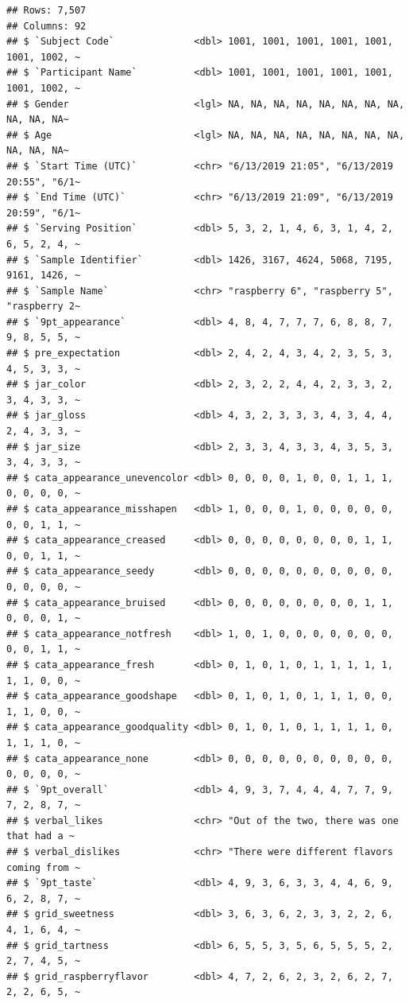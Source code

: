 \documentclass[
]{book}
\begin{document}
\begin{verbatim}
## Rows: 7,507
## Columns: 92
## $ `Subject Code`              <dbl> 1001, 1001, 1001, 1001, 1001, 1001, 1002, ~
## $ `Participant Name`          <dbl> 1001, 1001, 1001, 1001, 1001, 1001, 1002, ~
## $ Gender                      <lgl> NA, NA, NA, NA, NA, NA, NA, NA, NA, NA, NA~
## $ Age                         <lgl> NA, NA, NA, NA, NA, NA, NA, NA, NA, NA, NA~
## $ `Start Time (UTC)`          <chr> "6/13/2019 21:05", "6/13/2019 20:55", "6/1~
## $ `End Time (UTC)`            <chr> "6/13/2019 21:09", "6/13/2019 20:59", "6/1~
## $ `Serving Position`          <dbl> 5, 3, 2, 1, 4, 6, 3, 1, 4, 2, 6, 5, 2, 4, ~
## $ `Sample Identifier`         <dbl> 1426, 3167, 4624, 5068, 7195, 9161, 1426, ~
## $ `Sample Name`               <chr> "raspberry 6", "raspberry 5", "raspberry 2~
## $ `9pt_appearance`            <dbl> 4, 8, 4, 7, 7, 7, 6, 8, 8, 7, 9, 8, 5, 5, ~
## $ pre_expectation             <dbl> 2, 4, 2, 4, 3, 4, 2, 3, 5, 3, 4, 5, 3, 3, ~
## $ jar_color                   <dbl> 2, 3, 2, 2, 4, 4, 2, 3, 3, 2, 3, 4, 3, 3, ~
## $ jar_gloss                   <dbl> 4, 3, 2, 3, 3, 3, 4, 3, 4, 4, 2, 4, 3, 3, ~
## $ jar_size                    <dbl> 2, 3, 3, 4, 3, 3, 4, 3, 5, 3, 3, 4, 3, 3, ~
## $ cata_appearance_unevencolor <dbl> 0, 0, 0, 0, 1, 0, 0, 1, 1, 1, 0, 0, 0, 0, ~
## $ cata_appearance_misshapen   <dbl> 1, 0, 0, 0, 1, 0, 0, 0, 0, 0, 0, 0, 1, 1, ~
## $ cata_appearance_creased     <dbl> 0, 0, 0, 0, 0, 0, 0, 0, 1, 1, 0, 0, 1, 1, ~
## $ cata_appearance_seedy       <dbl> 0, 0, 0, 0, 0, 0, 0, 0, 0, 0, 0, 0, 0, 0, ~
## $ cata_appearance_bruised     <dbl> 0, 0, 0, 0, 0, 0, 0, 0, 1, 1, 0, 0, 0, 1, ~
## $ cata_appearance_notfresh    <dbl> 1, 0, 1, 0, 0, 0, 0, 0, 0, 0, 0, 0, 1, 1, ~
## $ cata_appearance_fresh       <dbl> 0, 1, 0, 1, 0, 1, 1, 1, 1, 1, 1, 1, 0, 0, ~
## $ cata_appearance_goodshape   <dbl> 0, 1, 0, 1, 0, 1, 1, 1, 0, 0, 1, 1, 0, 0, ~
## $ cata_appearance_goodquality <dbl> 0, 1, 0, 1, 0, 1, 1, 1, 1, 0, 1, 1, 1, 0, ~
## $ cata_appearance_none        <dbl> 0, 0, 0, 0, 0, 0, 0, 0, 0, 0, 0, 0, 0, 0, ~
## $ `9pt_overall`               <dbl> 4, 9, 3, 7, 4, 4, 4, 7, 7, 9, 7, 2, 8, 7, ~
## $ verbal_likes                <chr> "Out of the two, there was one that had a ~
## $ verbal_dislikes             <chr> "There were different flavors coming from ~
## $ `9pt_taste`                 <dbl> 4, 9, 3, 6, 3, 3, 4, 4, 6, 9, 6, 2, 8, 7, ~
## $ grid_sweetness              <dbl> 3, 6, 3, 6, 2, 3, 3, 2, 2, 6, 4, 1, 6, 4, ~
## $ grid_tartness               <dbl> 6, 5, 5, 3, 5, 6, 5, 5, 5, 2, 2, 7, 4, 5, ~
## $ grid_raspberryflavor        <dbl> 4, 7, 2, 6, 2, 3, 2, 6, 2, 7, 2, 2, 6, 5, ~

\end{verbatim}
\end{document}
